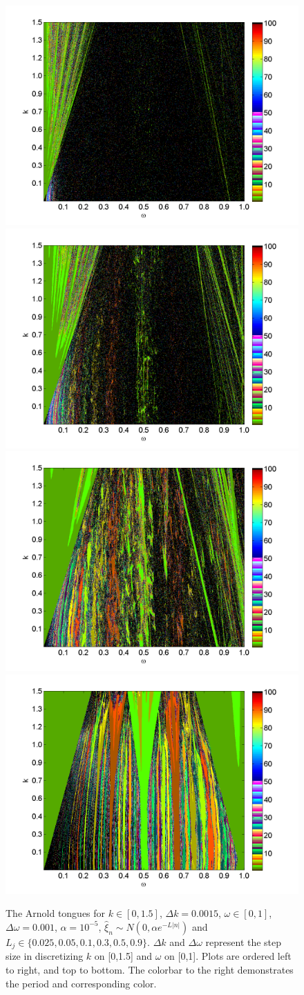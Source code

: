 \begin{figure}[H]\linespread{1}  
\caption[The Arnold tongues for the random circle map, normal
distribution, $\alpha = 10^{-5}$, $L \in (0.025,0.9)$]{The Arnold
  tongues for $k\in [0,1.5]$, $\Delta k = 0.0015$, $\omega \in [0,1]$,
  $\Delta \omega = 0.001$, $\alpha = 10^{-5}$, $\hat{\xi}_n\sim
  N(0,\alpha e^{-L|n|})$ and $L_j \in
  \{0.025,0.05,0.1,0.3,0.5,0.9\}$. $\Delta k$ and $\Delta \omega$
  represent the step size in discretizing $k$ on [0,1.5] and $\omega$
  on [0,1]. Plots are ordered left to right, and top to bottom. The colorbar
to the right demonstrates the period and corresponding color.}\label{fig:rcirctongues_n}
\centering
\includegraphics[width=.5\textwidth]{figs/tongues_norm_1000_L_0025.png}\hfill
\includegraphics[width=.5\textwidth]{figs/tongues_norm_1000_L_005.png}\\
\includegraphics[width=.5\textwidth]{figs/tongues_norm_1000_L_01.png}\hfill
\includegraphics[width=.5\textwidth]{figs/tongues_norm_1000_L_03.png}\\

\end{figure}
